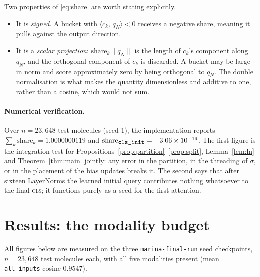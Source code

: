 \documentclass[11pt]{article}
\theoremstyle{plain}
\theoremstyle{remark}
\newcommand{\ip}[2]{\langle #1,\, #2\rangle}
\newcommand{\norm}[1]{\lVert #1 \rVert}
\newcommand{\code}[1]{\texttt{\small #1}}
\begin{document}
\noindent
Two properties of \eqref{eq:share} are worth stating explicitly.

\begin{itemize}
  \item It is \emph{signed}. A bucket with $\ip{c_k}{q_N} < 0$ receives a
        negative share, meaning it pulls against the output direction.
  \item It is a \emph{scalar projection}: $\text{share}_k\norm{q_N}$ is the
        length of $c_k$'s component along $q_N$, and the orthogonal component
        of $c_k$ is discarded. A bucket may be large in norm and score
        approximately zero by being orthogonal to $q_N$. The double
        normalisation is what makes the quantity dimensionless and additive to
        one, rather than a cosine, which would not sum.
\end{itemize}

\paragraph{Numerical verification.}
Over $n = 23{,}648$ test molecules (seed 1), the implementation reports
$\sum_k \text{share}_k = 1.0000000119$ and
$\text{share}_{\code{cls\_init}} = -3.06\times 10^{-19}$. The first figure is
the integration test for
Propositions~\ref{prop:partition}--\ref{prop:split},
Lemma~\ref{lem:ln} and Theorem~\ref{thm:main} jointly: any error in the
partition, in the threading of $\sigma$, or in the placement of the bias
updates breaks it. The second says that after sixteen LayerNorms the learned
initial query contributes nothing whatsoever to the final \textsc{cls}; it
functions purely as a seed for the first attention.

\section{Results: the modality budget}
\label{sec:budget}

All figures below are measured on the three \code{marina-final-run} seed
checkpoints, $n = 23{,}648$ test molecules each, with all five modalities
present (mean \code{all\_inputs} cosine $0.9547$).
\end{document}
